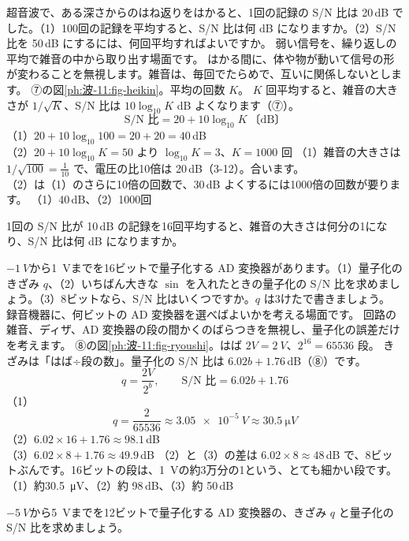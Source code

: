 \label{ph:波-11:ex9}
\begin{phreidai}[繰り返して平均する]
超音波で、ある深さからのはね返りをはかると、1回の記録の S/N 比は 20\,dB でした。（1）100回の記録を平均すると、S/N 比は何 dB になりますか。（2）S/N 比を 50\,dB にするには、何回平均すればよいですか。
\phbamen
弱い信号を、繰り返しの平均で雑音の中から取り出す場面です。
\phmushi
はかる間に、体や物が動いて信号の形が変わることを無視します。雑音は、毎回でたらめで、互いに関係しないとします。
\phzu
⑦の図\ref{ph:波-11:fig-heikin}。平均の回数 $K$。
\phriyu
$K$ 回平均すると、雑音の大きさが $1/\sqrt K$、S/N 比は $10\log_{10}K$ dB よくなります（⑦）。
\phtateru
\[\text{S/N 比}=20+10\log_{10}K\ \text{〔dB〕}\]
\phtoku
（1）$20+10\log_{10}100=20+20=40$\,dB\\
（2）$20+10\log_{10}K=50$ より $\log_{10}K=3$、$K=1000$ 回
\phtashikame
（1）雑音の大きさは $1/\sqrt{100}=\tfrac{1}{10}$ で、電圧の比10倍は 20\,dB（3-12）。合います。\\
（2）は（1）のさらに10倍の回数で、30\,dB よくするには1000倍の回数が要ります。
\kotae （1）40\,dB、（2）1000回
\end{phreidai}
\begin{jibun}
1回の S/N 比が 10\,dB の記録を16回平均すると、雑音の大きさは何分の1になり、S/N 比は何 dB になりますか。
\end{jibun}

\label{ph:波-11:ex10}
\begin{phreidai}
$-\qty{1}{V}$から\qty{1}{V}までを16ビットで量子化する AD 変換器があります。（1）量子化のきざみ $q$、（2）いちばん大きな $\sin$ を入れたときの量子化の S/N 比を求めましょう。（3）8ビットなら、S/N 比はいくつですか。$q$ は3けたで書きましょう。
\phbamen
録音機器に、何ビットの AD 変換器を選べばよいかを考える場面です。
\phmushi
回路の雑音、ディザ、AD 変換器の段の間かくのばらつきを無視し、量子化の誤差だけを考えます。
\phzu
⑧の図\ref{ph:波-11:fig-ryoushi}。はば $2V=\qty{2}{V}$、$2^{16}=\num{65536}$ 段。
\phriyu
きざみは「はば÷段の数」。量子化の S/N 比は $6.02b+1.76$\,dB（⑧）です。
\phtateru
\[q=\frac{2V}{2^b},\qquad\text{S/N 比}=6.02b+1.76\]
\phtoku
（1）\[q=\frac{2}{65536}\approx\qty{3.05e-5}{V}\approx\qty{30.5}{\micro V}\]
（2）$6.02\times16+1.76\approx98.1$\,dB\\
（3）$6.02\times8+1.76\approx49.9$\,dB
\phtashikame
（2）と（3）の差は $6.02\times8\approx48$\,dB で、8ビットぶんです。16ビットの段は、\qty{1}{V}の約3万分の1という、とても細かい段です。
\kotae （1）約\qty{30.5}{\micro V}、（2）約 98\,dB、（3）約 50\,dB
\end{phreidai}
\begin{jibun}
$-\qty{5}{V}$から\qty{5}{V}までを12ビットで量子化する AD 変換器の、きざみ $q$ と量子化の S/N 比を求めましょう。
\end{jibun}

